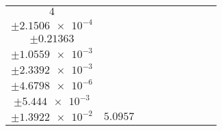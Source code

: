 \documentclass[8pt]{article}
\begin{document}
\begin{longtable}[l]{c c c c c c c c c}
$\num{4}$ & \begin{tabular}[c]{@{}c@{}}$\num{6.469e-2}$ \\ $\pm\num{2.1506e-4}$\end{tabular} & \begin{tabular}[c]{@{}c@{}}$\num{-0.80294}$ \\ $\pm\num{0.21363}$\end{tabular} & \begin{tabular}[c]{@{}c@{}}$\num{4.4504}$ \\ $\pm\num{1.0559e-3}$\end{tabular} & \begin{tabular}[c]{@{}c@{}}$\num{4.0495e+3}$ \\ $\pm\num{2.3392e-3}$\end{tabular} & \begin{tabular}[c]{@{}c@{}}$\num{8.1013}$ \\ $\pm\num{4.6798e-6}$\end{tabular} & \begin{tabular}[c]{@{}c@{}}$\num{1.6821}$ \\ $\pm\num{5.444e-3}$\end{tabular} & \begin{tabular}[c]{@{}c@{}}$\num{4.5352}$ \\ $\pm\num{1.3922e-2}$\end{tabular} & $\num{5.0957}$\\
\bottomrule
\end{longtable}
\end{document}
